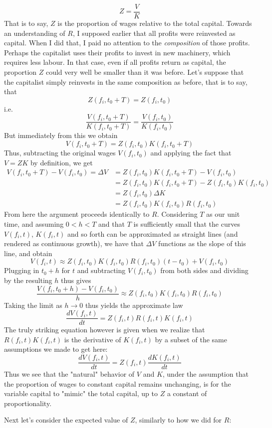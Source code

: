 \[ Z = \frac{V}{K} \]
That is to say, $Z$ is the proportion of wages relative to the total capital. Towards an understanding of $R$, I supposed earlier that all profits were reinvested as capital. When I did that, I paid no attention to the \textit{composition} of those profits. Perhaps the capitalist uses their profits to invest in new machinery, which requires less labour. In that case, even if all profits return as capital, the proportion $Z$ could very well be smaller than it was before. Let's suppose that the capitalist simply reinvests in the same composition as before, that is to say, that
\[ Z(f_i,t_0+T) = Z(f_i,t_0) \]
i.e.
\[ \frac{V(f_i,t_0+T)}{K(f_i,t_0+T)} = \frac{V(f_i,t_0)}{K(f_i,t_0)} \]
But immediately from this we obtain
\[ V(f_i,t_0+T) = Z(f_i,t_0)K(f_i,t_0+T) \]
Thus, subtracting the original wages $V(f_i,t_0)$ and applying the fact that $V = ZK$ by definition, we get 
\begin{align}
	V(f_i,t_0+T) - V(f_i,t_0) = \Delta V &= Z(f_i,t_0)K(f_i,t_0+T) - V(f_i,t_0) \\
	&= Z(f_i,t_0)K(f_i,t_0+T) - Z(f_i,t_0)K(f_i,t_0) \\
	&= Z(f_i,t_0)\Delta K \\
	&= Z(f_i,t_0)K(f_i,t_0)R(f_i,t_0)
\end{align}
From here the argument proceeds identically to $R$. Considering $T$ as our unit time, and assuming $0<h<T$ and that $T$ is sufficiently small that the curves $V(f_i,t)$, $K(f_i,t)$ and so forth can be approximated as straight lines (and rendered as continuous growth), we have that $\Delta V$ functions as the slope of this line, and obtain 
\[ V(f_i,t) \approx Z(f_i,t_0)K(f_i,t_0)R(f_i,t_0)(t-t_0)+V(f_i,t_0) \]
Plugging in $t_0+h$ for $t$ and subtracting $V(f_i,t_0)$ from both sides and dividing by the resulting $h$ thus gives
\[ \frac{V(f_i,t_0+h) - V(f_i,t_0)}{h} \approx Z(f_i,t_0)K(f_i,t_0)R(f_i,t_0) \]
Taking the limit as $h \to 0$ thus yields the approximate law
\[ \frac{dV(f_i,t)}{dt} = Z(f_i,t)R(f_i,t)K(f_i,t) \]
The truly striking equation however is given when we realize that $R(f_i,t)K(f_i,t)$ is the derivative of $K(f_i,t)$ by a subset of the same assumptions we made to get here:
\[ \frac{dV(f_i,t)}{dt} = Z(f_i,t)\frac{dK(f_i,t)}{dt} \] 
Thus we see that the "natural" behavior of $V$ and $K$, under the assumption that the proportion of wages to constant capital remains unchanging, is for the variable capital to "mimic" the total capital, up to $Z$ a constant of proportionality. \par
Next let's consider the expected value of $Z$, similarly to how we did for $R$:
